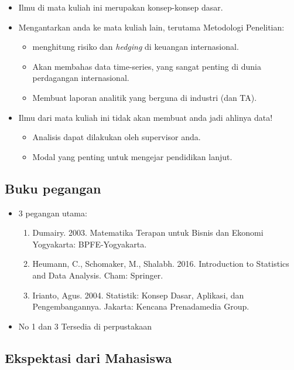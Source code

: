 \documentclass[
  letterpaper,
  DIV=11,
  numbers=noendperiod]{scrartcl}
\begin{document}
\begin{itemize}
\item
  Ilmu di mata kuliah ini merupakan konsep-konsep dasar.
\item
  Mengantarkan anda ke mata kuliah lain, terutama Metodologi Penelitian:

  \begin{itemize}
  \item
    menghitung risiko dan \emph{hedging} di keuangan internasional.
  \item
    Akan membahas data time-series, yang sangat penting di dunia
    perdagangan internasional.
  \item
    Membuat laporan analitik yang berguna di industri (dan TA).
  \end{itemize}
\item
  Ilmu dari mata kuliah ini tidak akan membuat anda jadi ahlinya data!

  \begin{itemize}
  \item
    Analisis dapat dilakukan oleh supervisor anda.
  \item
    Modal yang penting untuk mengejar pendidikan lanjut.
  \end{itemize}
\end{itemize}

\subsection{Buku pegangan}\label{buku-pegangan}

\begin{itemize}
\item
  3 pegangan utama:

  \begin{enumerate}
  \def\labelenumi{\arabic{enumi}.}
  \item
    Dumairy. 2003. Matematika Terapan untuk Bisnis dan Ekonomi
    Yogyakarta: BPFE-Yogyakarta.
  \item
    Heumann, C., Schomaker, M., Shalabh. 2016. Introduction to
    Statistics and Data Analysis. Cham: Springer.
  \item
    Irianto, Agus. 2004. Statistik: Konsep Dasar, Aplikasi, dan
    Pengembangannya. Jakarta: Kencana Prenadamedia Group.
  \end{enumerate}
\item
  No 1 dan 3 Tersedia di perpustakaan
\end{itemize}

\subsection{Ekspektasi dari Mahasiswa}\label{ekspektasi-dari-mahasiswa}
\end{document}
